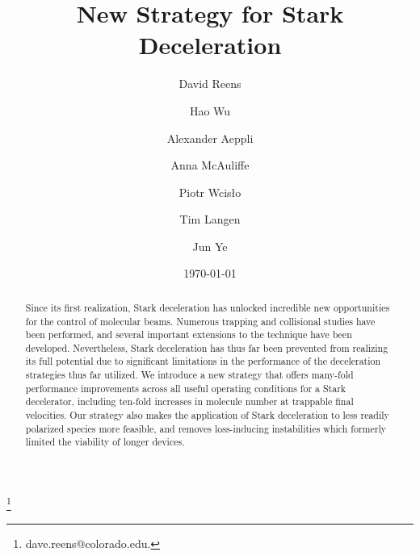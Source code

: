 \documentclass[%
 reprint,
 amsmath,amssymb,
 aps,
prl,
]{revtex4-1}
\begin{document}
\title{New Strategy for Stark Deceleration}%

\author{David Reens}
\thanks{dave.reens@colorado.edu.}

\author{Hao Wu}
\author{Alexander Aeppli}
\author{Anna McAuliffe}
\author{Piotr Wcis\l o}
\author{Tim Langen}%

\author{Jun Ye}


\date{\today}



\begin{abstract}
Since its first realization, Stark deceleration has unlocked incredible new opportunities for the control of molecular beams. 
Numerous trapping and collisional studies have been performed, and several important extensions to the technique have been developed. 
Nevertheless, Stark deceleration has thus far been prevented from realizing its full potential due to significant limitations in the performance of the deceleration strategies thus far utilized.
We introduce a new strategy that offers many-fold performance improvements across all useful operating conditions for a Stark decelerator, including ten-fold increases in molecule number at trappable final velocities.
Our strategy also makes the application of Stark deceleration to less readily polarized species more feasible, and removes loss-inducing instabilities which formerly limited the viability of longer devices.
\end{abstract}

\maketitle
\end{document}
